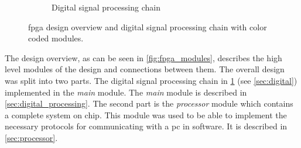\documentclass[12pt,a4paper,parskip=full,abstract=true,BCOR=12mm,twoside,open=right]{scrreprt}
\def\device#1{\textit{#1}}
\begin{document}
\begin{figure}[htb]
\begin{subfigure}[c]{.29\linewidth}
{
        }
        \caption{Digital signal processing chain}
        \label{fig:digital_chain}
    \end{subfigure}
    \caption{\gls{fpga} design overview and digital signal processing chain with color coded modules.}
    \label{fig:fpga_overview}
\end{figure}

The design overview, as can be seen in \cref{fig:fpga_modules}, describes
the high level modules of the design and connections between them. The overall
design was split into two parts. The digital signal processing chain
in \cref{fig:digital_chain} (see \cref{sec:digital}) implemented in the
\device{main} module. The \device{main} module is described in
\cref{sec:digital_processing}. The second part is the \device{processor} module
which contains a complete system on chip. This module was used to be able to
implement the necessary protocols for communicating with a \gls{pc} in software.
It is described in \cref{sec:processor}.
\end{document}
